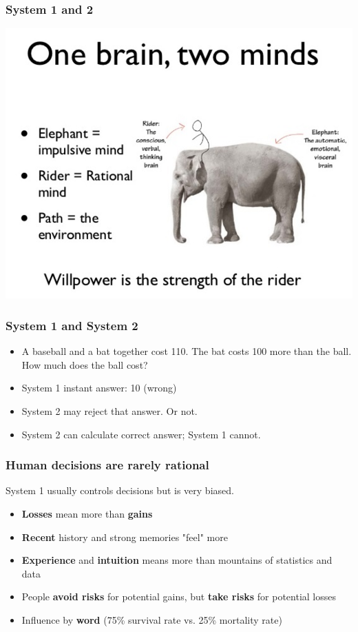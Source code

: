 \documentclass{beamer}
\begin{document}
\begin{frame}
	\frametitle{System 1 and 2}
	\centering
	\includegraphics[width=0.8\linewidth]{image/brain}
\end{frame}

\begin{frame}
	\frametitle{System 1 and System 2}
	\begin{itemize}
		\item A baseball and a bat together cost 110.  The bat costs 100 more than the ball.
		How much does the ball cost? 
		\item System 1 instant answer: 10  (wrong)
		\item System 2 may reject that answer.  Or not.
		\item System 2 can calculate correct answer; System 1 cannot.
	\end{itemize}
\end{frame}

\begin{frame}
	\frametitle{Human decisions are rarely rational}
	System 1 usually controls decisions but is very biased.
	\begin{itemize}
		\item \textbf{Losses} mean more than \textbf{gains}
		\item \textbf{Recent} history and strong memories "feel" more
		\item \textbf{Experience} and \textbf{intuition} means more than mountains of statistics and data
		\item People \textbf{avoid risks} for potential gains, but \textbf{take risks} for potential losses
		\item Influence by \textbf{word} (75\% survival rate vs. 25\% mortality rate)
	\end{itemize}
\end{frame}
\end{document}
